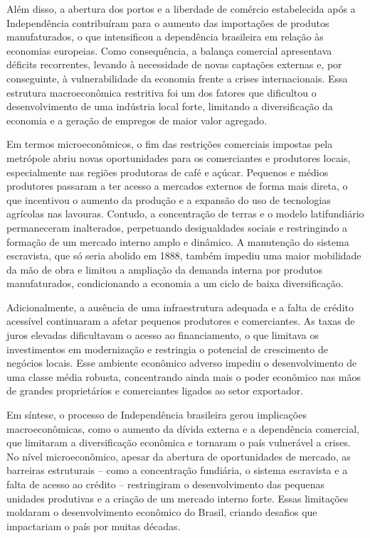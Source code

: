 \documentclass[a4paper,12pt]{article}[abntex2]
\begin{document}
Além disso, a abertura dos portos e a liberdade de comércio estabelecida após a Independência contribuíram para o aumento das importações de produtos manufaturados, o que intensificou a dependência brasileira em relação às economias europeias. Como consequência, a balança comercial apresentava déficits recorrentes, levando à necessidade de novas captações externas e, por conseguinte, à vulnerabilidade da economia frente a crises internacionais. Essa estrutura macroeconômica restritiva foi um dos fatores que dificultou o desenvolvimento de uma indústria local forte, limitando a diversificação da economia e a geração de empregos de maior valor agregado.

Em termos microeconômicos, o fim das restrições comerciais impostas pela metrópole abriu novas oportunidades para os comerciantes e produtores locais, especialmente nas regiões produtoras de café e açúcar. Pequenos e médios produtores passaram a ter acesso a mercados externos de forma mais direta, o que incentivou o aumento da produção e a expansão do uso de tecnologias agrícolas nas lavouras. Contudo, a concentração de terras e o modelo latifundiário permaneceram inalterados, perpetuando desigualdades sociais e restringindo a formação de um mercado interno amplo e dinâmico. A manutenção do sistema escravista, que só seria abolido em 1888, também impediu uma maior mobilidade da mão de obra e limitou a ampliação da demanda interna por produtos manufaturados, condicionando a economia a um ciclo de baixa diversificação.

Adicionalmente, a ausência de uma infraestrutura adequada e a falta de crédito acessível continuaram a afetar pequenos produtores e comerciantes. As taxas de juros elevadas dificultavam o acesso ao financiamento, o que limitava os investimentos em modernização e restringia o potencial de crescimento de negócios locais. Esse ambiente econômico adverso impediu o desenvolvimento de uma classe média robusta, concentrando ainda mais o poder econômico nas mãos de grandes proprietários e comerciantes ligados ao setor exportador.

Em síntese, o processo de Independência brasileira gerou implicações macroeconômicas, como o aumento da dívida externa e a dependência comercial, que limitaram a diversificação econômica e tornaram o país vulnerável a crises. No nível microeconômico, apesar da abertura de oportunidades de mercado, as barreiras estruturais – como a concentração fundiária, o sistema escravista e a falta de acesso ao crédito – restringiram o desenvolvimento das pequenas unidades produtivas e a criação de um mercado interno forte. Essas limitações moldaram o desenvolvimento econômico do Brasil, criando desafios que impactariam o país por muitas décadas.
\end{document}
